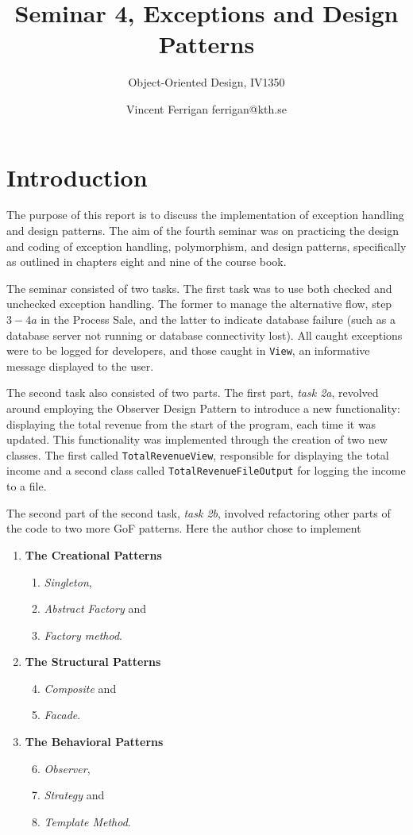 \documentclass[a4paper]{scrreprt}
\title{Seminar 4, Exceptions and Design Patterns}
\subtitle{Object-Oriented Design, IV1350}
\author{Vincent Ferrigan ferrigan@kth.se}
\begin{document}
\maketitle

\tableofcontents %

\chapter{Introduction}
The purpose of this report is to discuss the implementation of exception handling
and design patterns.
The aim of the fourth seminar was on practicing the design
and coding of exception handling, polymorphism, and design patterns,
specifically as outlined in chapters eight and nine of the course book.

The seminar consisted of two tasks.
The first task was to use both checked and
unchecked exception handling.
The former to manage the alternative flow, step $3-4a$
in the Process Sale, and the latter to indicate database failure (such as a
database server not running or database connectivity lost).
All caught exceptions were to be logged for developers, and those caught
in \verb|View|, an informative message displayed to the user.

The second task also consisted of two parts.
The first part, \emph{task 2a}, revolved
around employing the Observer Design Pattern to introduce a new functionality:
displaying the total revenue from the start of the program, each time it was
updated.
This functionality was implemented through the creation of two new
classes.
The first called \texttt{TotalRevenueView}, responsible for displaying the
total income and a second class called \texttt{TotalRevenueFileOutput} for logging the
income to a file.

The second part of the second task, \emph{task 2b}, involved refactoring other parts of
the code to two more GoF patterns.
Here the author chose to implement
\begin{enumerate}
\item \textbf{The Creational Patterns}
\begin{enumerate}
    \item \emph{Singleton},
    \item \emph{Abstract Factory} and
    \item \emph{Factory method}.
\end{enumerate}
\item \textbf{The Structural Patterns}
\begin{enumerate}
    \setcounter{enumi}{3}
    \item \emph{Composite} and
    \item \emph{Facade}.
\end{enumerate}
\item \textbf{The Behavioral Patterns}
\begin{enumerate}
    \setcounter{enumi}{5}
    \item \emph{Observer},
    \item \emph{Strategy} and
    \item \emph{Template Method}.
\end{enumerate}
\end{enumerate}
\end{document}
